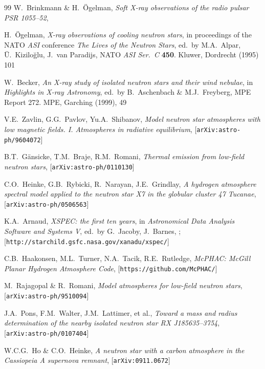 \documentclass{pos1}
\begin{document}
\begin{thebibliography}{99}
W.~Brinkmann \& H.~\"Ogelman,
\textit{Soft X-ray observations of the radio pulsar PSR 1055--52},

H.~{\"O}gelman,
\textit{X-ray observations of cooling neutron stars},
in proceedings of the NATO \textit{ASI} conference
\textit{The Lives of the Neutron Stars},
ed.~by M.A.\ Alpar, \"U.\ Kizilo\u{g}lu, J.\ van Paradijs,
NATO \textit{ASI Ser.\ C} \textbf{450}.
Kluwer, Dordrecht (1995) 101

W.~Becker,
\textit{An X-ray study of isolated neutron stars and their wind nebulae},
in \textit{Highlights in X-ray Astronomy},
ed.~by B.~Aschenbach \& M.J.~Freyberg, MPE Report 272.
MPE, Garching (1999), 49

V.E.~Zavlin, G.G.~Pavlov, Yu.A.~Shibanov,
\textit{Model neutron star atmospheres with low magnetic fields. I. Atmospheres in radiative equilibrium},
[\texttt{arXiv:astro-ph/9604072}]

B.T.~G\"ansicke, T.M.~Braje, R.M.~Romani,
\textit{Thermal emission from low-field neutron stars},
[\texttt{arXiv:astro-ph/0110130}]

C.O.~Heinke, G.B.~Rybicki, R.~Narayan, J.E.~Grindlay,
\textit{A hydrogen atmosphere spectral model applied to the neutron star X7 in the globular cluster 47 Tucanae},
[\texttt{arXiv:astro-ph/0506563}]

K.A.~Arnaud,
\textit{XSPEC: the first ten years},
in \textit{Astronomical Data Analysis Software and Systems V},
ed.~by G.~Jacoby, J.~Barnes,
;
[\texttt{http://starchild.gsfc.nasa.gov/xanadu/xspec/}]

C.B.~Haakonsen, M.L.~Turner, N.A.~Tacik, R.E.~Rutledge,
\textit{McPHAC: McGill Planar Hydrogen Atmosphere Code},
[\texttt{https://github.com/McPHAC/}]

M.~Rajagopal \& R.~Romani,
\textit{Model atmospheres for low-field neutron stars},
[\texttt{arXiv:astro-ph/9510094}]

J.A.~Pons, F.M.~Walter, J.M.~Lattimer, et al.,
\textit{Toward a mass and radius determination of the nearby isolated neutron star RX J185635--3754},
[\texttt{arXiv:astro-ph/0107404}]

W.C.G.~Ho \& C.O.~Heinke,
\textit{A neutron star with a carbon atmosphere in the Cassiopeia A supernova remnant},
[\texttt{arXiv:0911.0672}]


\end{thebibliography}
\end{document}
